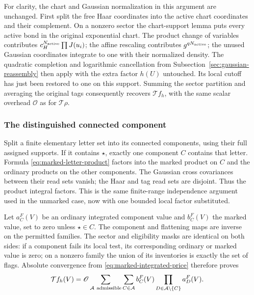 For clarity, the chart and Gaussian normalization in this argument
are unchanged. First split the free Haar coordinates into the
active chart coordinates and their complement. On a nonzero sector
the chart-support lemma puts every active bond in the original
exponential chart. The product change of variables contributes
$c_H^{N_{\rm active}}\prod J(u_i)$; the affine rescaling contributes
$g^{qN_{\rm active}}$; the unused Gaussian coordinates integrate to
one with their normalized density. The quadratic completion and
logarithmic cancellation from
Subsection~\ref{sec:gaussian-reassembly} then apply with the extra
factor $h(U)$ untouched. Its local cutoff has just been restored
to one on this support. Summing the sector partition and averaging
the original tags consequently recovers $\mathcal T f_h$, with the
same scalar overhead $\mathscr O$ as for $\mathcal T\rho$.

\subsubsection{The distinguished connected component}
Split a finite elementary letter set into its connected components,
using their full assigned supports. If it contains $\star$, exactly
one component $C$ contains that letter. Formula
\eqref{eq:marked-letter-product} factors into the marked product on
$C$ and the ordinary products on the other components. The Gaussian
cross covariances between their read sets vanish; the Haar and tag
read sets are disjoint. Thus the product integral factors. This is
the same finite-range independence argument used in the unmarked
case, now with one bounded local factor substituted.

Let $a_C^F(V)$ be an ordinary integrated component value and
$b_C^F(V)$ the marked value, set to zero unless $\star\in C$.
The component and flattening maps are inverse on the permitted
families. The sector and eligibility masks are identical on both
sides: if a component fails its local test, its corresponding
ordinary or marked value is zero; on a nonzero family the union of
its inventories is exactly the set of flags. Absolute convergence
from \eqref{eq:marked-integrated-price} therefore proves
\begin{equation}\label{eq:marked-forest-integral}
 \mathcal T f_h(V)=\mathscr O
 \sum_{\mathcal A\ {\rm admissible}}
    \sum_{C\in\mathcal A}b_C^F(V)
                       \prod_{D\in\mathcal A\setminus\{C\}}a_D^F(V).
\end{equation}

